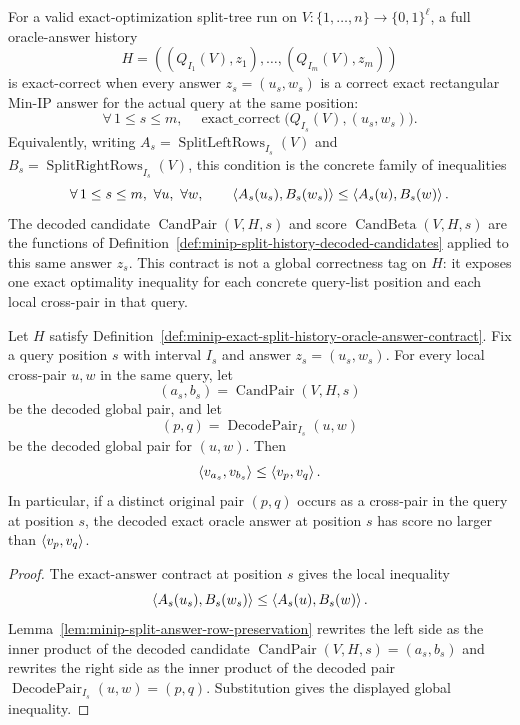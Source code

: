 \begin{definition}
  \label{def:minip-exact-split-history-oracle-answer-contract}
  For a valid exact-optimization split-tree run on
  $V:\{1,\ldots,n\}\to\{0,1\}^{\ell}$, a full oracle-answer history
  \[
    H=((Q_{I_1}(V),z_1),\ldots,(Q_{I_m}(V),z_m))
  \]
  is exact-correct when every answer $z_s=(u_s,w_s)$ is a correct exact
  rectangular Min-IP answer for the actual query at the same position:
  \[
    \forall\,1\leq s\leq m,\quad
      \operatorname{exact\_correct}
        \bigl(Q_{I_s}(V),(u_s,w_s)\bigr).
  \]
  Equivalently, writing
  $A_s=\operatorname{SplitLeftRows}_{I_s}(V)$ and
  $B_s=\operatorname{SplitRightRows}_{I_s}(V)$, this condition is the concrete
  family of inequalities
  \[
    \forall\,1\leq s\leq m,\ \forall u,\ \forall w,\qquad
      \left\langle A_s(u_s),B_s(w_s)\right\rangle
      \leq
      \left\langle A_s(u),B_s(w)\right\rangle.
  \]
  The decoded candidate
  $\operatorname{CandPair}(V,H,s)$ and score
  $\operatorname{CandBeta}(V,H,s)$ are the functions of
  Definition~\ref{def:minip-split-history-decoded-candidates} applied to this
  same answer $z_s$.  This contract is not a global correctness tag on $H$:
  it exposes one exact optimality inequality for each concrete query-list
  position and each local cross-pair in that query.
\end{definition}

\begin{lemma}
  \label{lem:minip-exact-decoded-answer-cross-optimal}
  Let $H$ satisfy
  Definition~\ref{def:minip-exact-split-history-oracle-answer-contract}.  Fix
  a query position $s$ with interval $I_s$ and answer
  $z_s=(u_s,w_s)$.  For every local cross-pair $u,w$ in the same query,
  let
  \[
    (a_s,b_s)=\operatorname{CandPair}(V,H,s)
  \]
  be the decoded global pair, and let
  \[
    (p,q)=\operatorname{DecodePair}_{I_s}(u,w)
  \]
  be the decoded global pair for $(u,w)$.  Then
  \[
    \left\langle v_{a_s},v_{b_s}\right\rangle\leq \left\langle v_p,v_q\right\rangle.
  \]
  In particular, if a distinct original pair $(p,q)$ occurs as a cross-pair in
  the query at position $s$, the decoded exact oracle answer at position $s$
  has score no larger than $\left\langle v_p,v_q\right\rangle$.
\end{lemma}
\begin{proof}
  The exact-answer contract at position $s$ gives the local inequality
  \[
    \left\langle A_s(u_s),B_s(w_s)\right\rangle\leq\left\langle A_s(u),B_s(w)\right\rangle.
  \]
  Lemma~\ref{lem:minip-split-answer-row-preservation} rewrites the left side
  as the inner product of the decoded candidate
  $\operatorname{CandPair}(V,H,s)=(a_s,b_s)$ and rewrites the right side as the
  inner product of the decoded pair
  $\operatorname{DecodePair}_{I_s}(u,w)=(p,q)$.  Substitution gives the
  displayed global inequality.
\end{proof}

